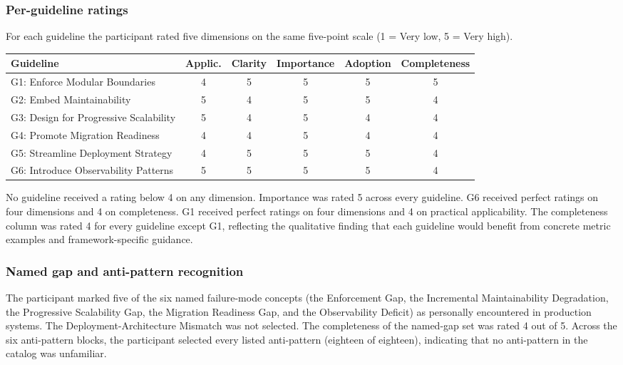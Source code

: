 \subsubsection*{Per-guideline ratings}

For each guideline the participant rated five dimensions on the same five-point scale (1 = Very low, 5 = Very high).

\begin{longtable}{p{5cm} c c c c c}
\toprule
\textbf{Guideline} & \textbf{Applic.} & \textbf{Clarity} & \textbf{Importance} & \textbf{Adoption} & \textbf{Completeness} \\
\midrule
\endhead
G1: Enforce Modular Boundaries  & 4 & 5 & 5 & 5 & 5 \\
G2: Embed Maintainability       & 5 & 4 & 5 & 5 & 4 \\
G3: Design for Progressive Scalability & 5 & 4 & 5 & 4 & 4 \\
G4: Promote Migration Readiness & 4 & 4 & 5 & 4 & 4 \\
G5: Streamline Deployment Strategy & 4 & 5 & 5 & 5 & 4 \\
G6: Introduce Observability Patterns & 5 & 5 & 5 & 5 & 4 \\
\bottomrule
\end{longtable}

No guideline received a rating below 4 on any dimension. Importance was rated 5 across every guideline. G6 received perfect ratings on four dimensions and 4 on completeness. G1 received perfect ratings on four dimensions and 4 on practical applicability. The completeness column was rated 4 for every guideline except G1, reflecting the qualitative finding that each guideline would benefit from concrete metric examples and framework-specific guidance.

\subsubsection*{Named gap and anti-pattern recognition}

The participant marked five of the six named failure-mode concepts (the Enforcement Gap, the Incremental Maintainability Degradation, the Progressive Scalability Gap, the Migration Readiness Gap, and the Observability Deficit) as personally encountered in production systems. The Deployment-Architecture Mismatch was not selected. The completeness of the named-gap set was rated 4 out of 5. Across the six anti-pattern blocks, the participant selected every listed anti-pattern (eighteen of eighteen), indicating that no anti-pattern in the catalog was unfamiliar.

